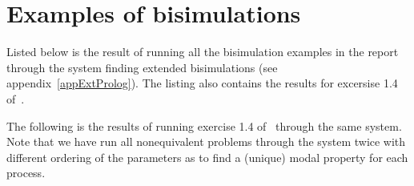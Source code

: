 \chapter{Examples of bisimulations}\label{appExamples}

Listed below is the result of running all the bisimulation examples in the report through the system finding extended bisimulations (see appendix~\ref{appExtProlog}). The listing also contains the results for excersise 1.4 of~\cite{Milner}.

\newpage

%
%
%
%

\noindent
The following is the results of running exercise 1.4 of~\cite{Milner} through the same system. Note that we have run all nonequivalent problems through the system twice with different ordering of the parameters as to find a (unique) modal property for each process.
%
%

%
%

%
%

%
%

%
%

%
%

%
%

%
%

